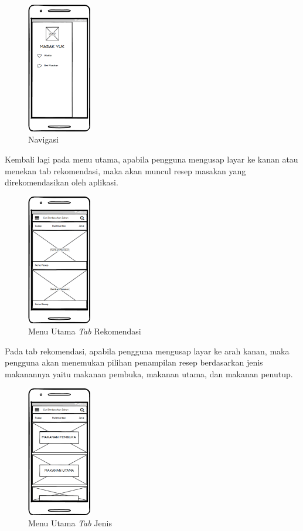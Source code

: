 		\begin{figure}[H]
			\centering
			\includegraphics[width=0.25\textwidth]{gambar/wireframe/Drawer}
			\caption{Navigasi}
			\label{nav}
		\end{figure}
		Kembali lagi pada menu utama, apabila pengguna mengusap layar ke kanan atau menekan tab rekomendasi, maka akan muncul resep masakan yang direkomendasikan oleh aplikasi.
		\begin{figure}[H]
			\centering
			\includegraphics[width=0.25\textwidth]{gambar/wireframe/Rekomendasi}
			\caption{Menu Utama \textit{Tab} Rekomendasi}
		\end{figure}
		\vspace{2cm}
		Pada tab rekomendasi, apabila pengguna mengusap layar ke arah kanan, maka pengguna akan menemukan pilihan penampilan resep berdasarkan jenis makanannya yaitu makanan pembuka, makanan utama, dan makanan penutup.
		\begin{figure}[H]
			\centering
			\includegraphics[width=0.25\textwidth]{gambar/wireframe/Jenis}
			\caption{Menu Utama \textit{Tab} Jenis}
		\end{figure}
